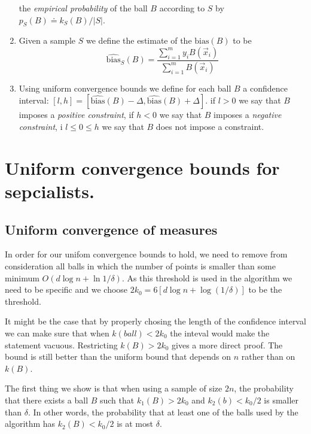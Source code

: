 \documentclass{article}
\newtheorem{theorem}{Theorem}[section]
\newcommand{\B}{{\cal B}}
\newcommand{\x}{\vec{x}}
\newcommand{\bias}{\text{bias}}
\newcommand{\ebias}{\widehat{\text{bias}}}
\newcommand{\samp}{S}
\begin{document}
\begin{enumerate}
    the {\em empirical probability} of the ball $B$ according to
    $\samp$ by $p_{\samp}(B) \doteq k_{\samp}(B)/|\samp|$.
  \item Given a sample $\samp$ we define the estimate of the
    $\bias(B)$ to be
    \[
    \ebias_{\samp}(B) = \frac{\sum_{i=1}^m y_i B(\x_i)}{\sum_{i=1}^m B(\x_i)}
    \]
  \item Using uniform convergence bounds we define for each ball $B$
    a confidence interval:
    $[l,h]=[\ebias(B)-\Delta,\ebias(B)+\Delta]$.
    if $l>0$ we say that $B$ imposes a {\em positive constraint}, if
    $h<0$ we say that $B$ imposes a {\em negative constraint}, i
    $l\leq 0 \leq h$ we say that $B$ does not impose a constraint.
\end{enumerate}

\section{Uniform convergence bounds for sepcialists.}
\subsection{Uniform convergence of measures}

In order for our unifom convergence bounds to hold, we need to remove
from consideration all balls in which the number of points is smaller
than some minimum $O(d \log n + \ln 1/\delta)$. As this threshold is
used in the algorithm we need to be specific and we choose
$2k_0=6\left[  d \log n + \log(1/\delta) \right]$ to be the threshold.

It might be the case that by properly chosing the length of the
confidence interval we can make sure that when $k(ball)<2k_0$ the
inteval would make the statement vacuous. Restricting $k(B)>2k_0$
gives a more direct proof. The bound is still better than the uniform
bound that depends on $n$ rather than on $k(B)$.

The first thing we show is that when using a sample of size $2n$, the
probability that there exists a ball $B$ such that $k_1(B)>2k_0$ and
$k_2(b)<k_0/2$ is smaller than $\delta$. In other words, the
probability that at least one of the balls used by the algorithm has
$k_2(B)<k_0/2$ is at most $\delta$.

\end{document}
